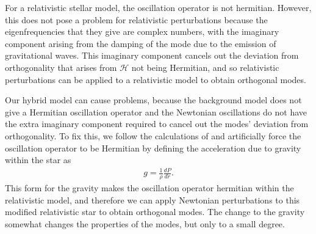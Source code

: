 \documentclass[fleqn,usenatbib]{mnras}
\begin{document}
\hspace{\parindent}For a relativistic stellar model, the oscillation operator is not hermitian. However, this does not pose a problem for relativistic perturbations because the eigenfrequencies that they give are complex numbers, with the imaginary component arising from the damping of the mode due to the emission of gravitational waves. This imaginary component cancels out the deviation from orthogonality that arises from $\mathcal{H}$ not being Hermitian, and so relativistic perturbations can be applied to a relativistic model to obtain orthogonal modes.

\hspace{\parindent} Our hybrid model can cause problems, because the background model does not give a Hermitian oscillation operator and the Newtonian oscillations do not have the extra imaginary component required to cancel out the modes' deviation from orthogonality. To fix this, we follow the calculations of \citet{reisenegger1994multipole} and artificially force the oscillation operator to be Hermitian by defining the acceleration due to gravity within the star as
\begin{align}
g=\frac{1}{\rho}\frac{dP}{dr}.
\label{eq:rel_grav}
\end{align}
\noindent This form for the gravity makes the oscillation operator hermitian within the relativistic model, and therefore we can apply Newtonian perturbations to this modified relativistic star to obtain orthogonal modes. The change to the gravity somewhat changes the properties of the modes, but only to a small degree.













\iffalse
\end{document}
